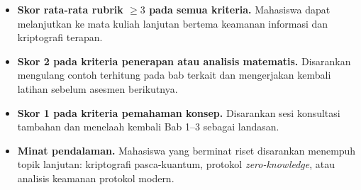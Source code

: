 \documentclass[../main.tex]{subfiles}
\begin{document}
\begin{itemize}
    \item \textbf{Skor rata-rata rubrik $\geq 3$ pada semua kriteria.} Mahasiswa
          dapat melanjutkan ke mata kuliah lanjutan bertema keamanan informasi
          dan kriptografi terapan.
    \item \textbf{Skor 2 pada kriteria penerapan atau analisis matematis.}
          Disarankan mengulang contoh terhitung pada bab terkait dan
          mengerjakan kembali latihan sebelum asesmen berikutnya.
    \item \textbf{Skor 1 pada kriteria pemahaman konsep.} Disarankan sesi
          konsultasi tambahan dan menelaah kembali Bab 1--3 sebagai landasan.
    \item \textbf{Minat pendalaman.} Mahasiswa yang berminat riset disarankan
          menempuh topik lanjutan: kriptografi pasca-kuantum, protokol
          \textit{zero-knowledge}, atau analisis keamanan protokol modern.
\end{itemize}
\end{document}
